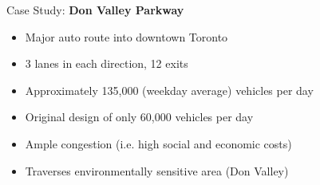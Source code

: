 \documentclass[aspectratio=169]{beamer}
\begin{document}
\begin{frame}
	
	
	
	\begin{columns}
		\begin{column}{0.7\textwidth}
			
			Case Study: \textbf{Don Valley Parkway}
	
			\begin{itemize}
				\item Major auto route into downtown Toronto
				\item 3 lanes in each direction, 12 exits
				\item Approximately 135,000 (weekday average) vehicles per day
				\item Original design of only 60,000 vehicles per day
				\item Ample congestion (i.e. high social and economic costs)
				\item Traverses environmentally sensitive area (Don Valley)
			\end{itemize}

		\end{column}

	\begin{column}{0.3\textwidth}
		

\end{column}
\end{columns}
\end{frame}
\end{document}
